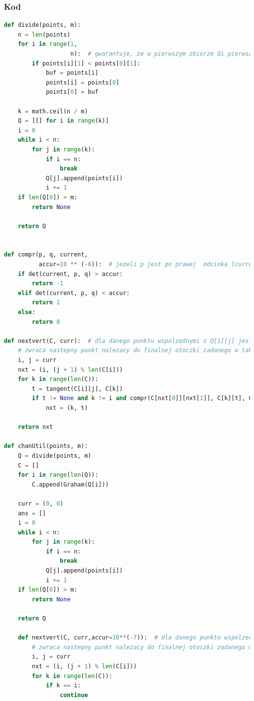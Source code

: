 \documentclass[11pt]{article}
\theoremstyle{remark} \newtheorem{definition}{def.}
\theoremstyle{definition} \newtheorem{twierdzenie}{tw.}
\begin{document}
    \subsubsection{Kod}
\begin{lstlisting}[language=Python]
def divide(points, m):
    n = len(points)
    for i in range(1,
                   n):  # gwarantuje, ze w pierwszym zbiorze Qi pierwszy element jest najnizszy, czyli nalezy do otoczki ostatecznej
        if points[i][1] < points[0][1]:
            buf = points[i]
            points[i] = points[0]
            points[0] = buf

    k = math.ceil(n / m)
    Q = [[] for i in range(k)]
    i = 0
    while i < n:
        for j in range(k):
            if i == n:
                break
            Q[j].append(points[i])
            i += 1
    if len(Q[0]) > m:
        return None

    return Q


def compr(p, q, current,
          accur=10 ** (-6)):  # jezeli p jest po prawej  odcinka [current,q] - jest 'wiekszy', to zwracamy 1
    if det(current, p, q) > accur:
        return -1
    elif det(current, p, q) < accur:
        return 1
    else:
        return 0

def nextvert(C, curr):  # dla danego punktu wspolzednymi z Q[i][j] jesli jest to punkt nalezacy do finalnej otoczki, to
    # zwraca nastepny punkt nalezacy do finalnej otoczki zadanego w takich samych wspolzednych Q[nxt[0]][nxt[1]]
    i, j = curr
    nxt = (i, (j + 1) % len(C[i]))
    for k in range(len(C)):
        t = tangent(C[i][j], C[k])
        if t != None and k != i and compr(C[nxt[0]][nxt[1]], C[k][t], C[i][j]) > 0 and (k, t) != (curr):
            nxt = (k, t)

    return nxt

def chanUtil(points, m):
    Q = divide(points, m)
    C = []
    for i in range(len(Q)):
        C.append(Graham(Q[i]))

    curr = (0, 0)
    ans = []
    i = 0
    while i < n:
        for j in range(k):
            if i == n:
                break
            Q[j].append(points[i])
            i += 1
    if len(Q[0]) > m:
        return None

    return Q
    
    def nextvert(C, curr,accur=10**(-7)):  # dla danego punktu wspolzednymi z Q[i][j] jesli jest to punkt nalezacy do finalnej otoczki, to
        # zwraca nastepny punkt nalezacy do finalnej otoczki zadanego w takich samych wspolzednych Q[nxt[0]][nxt[1]]
        i, j = curr
        nxt = (i, (j + 1) % len(C[i]))
        for k in range(len(C)):
            if k == i:
                continue
    

\end{lstlisting}
\end{document}
